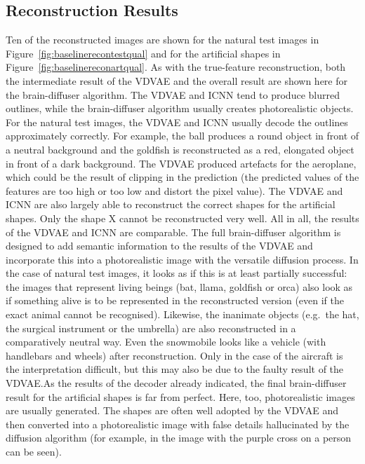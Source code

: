 \subsection{Reconstruction Results}
Ten of the reconstructed images are shown for the natural test images in Figure~\ref{fig:baselinerecontestqual} and for the artificial shapes in Figure~\ref{fig:baselinereconartqual}. As with the true-feature reconstruction, both the intermediate result of the VDVAE and the overall result are shown here for the brain-diffuser algorithm. The VDVAE and ICNN tend to produce blurred outlines, while the brain-diffuser algorithm usually creates photorealistic objects. For the natural test images, the VDVAE and ICNN usually decode the outlines approximately correctly. For example, the ball produces a round object in front of a neutral background and the goldfish is reconstructed as a red, elongated object in front of a dark background. The VDVAE produced artefacts for the aeroplane, which could be the result of clipping in the prediction (the predicted values of the features are too high or too low and distort the pixel value). The VDVAE and ICNN are also largely able to reconstruct the correct shapes for the artificial shapes. Only the shape X cannot be reconstructed very well. All in all, the results of the VDVAE and ICNN are comparable. The full brain-diffuser algorithm is designed to add semantic information to the results of the VDVAE and incorporate this into a photorealistic image with the versatile diffusion process. In the case of natural test images, it looks as if this is at least partially successful: the images that represent living beings (bat, llama, goldfish or orca) also look as if something alive is to be represented in the reconstructed version (even if the exact animal cannot be recognised). Likewise, the inanimate objects (e.g.\ the hat, the surgical instrument or the umbrella) are also reconstructed in a comparatively neutral way. Even the snowmobile looks like a vehicle (with handlebars and wheels) after reconstruction. Only in the case of the aircraft is the interpretation difficult, but this may also be due to the faulty result of the VDVAE.\@ As the results of the decoder already indicated, the final brain-diffuser result for the artificial shapes is far from perfect. Here, too, photorealistic images are usually generated. The shapes are often well adopted by the VDVAE and then converted into a photorealistic image with false details hallucinated by the diffusion algorithm (for example, in the image with the purple cross on a person can be seen). 

